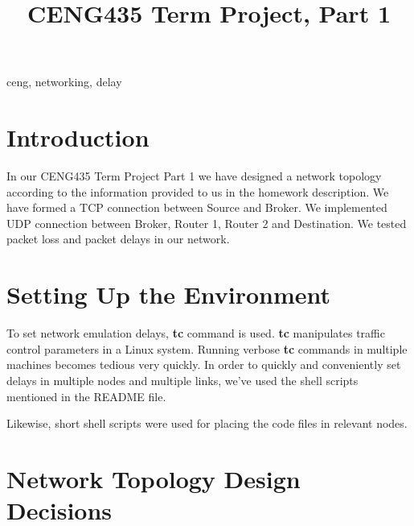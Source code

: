 \documentclass[conference]{IEEEtran}
\begin{document}
\title{CENG435 Term Project, Part 1\\
}

\author{
\IEEEauthorblockA{
}
\and
{}
\IEEEauthorblockA{
}
}

\maketitle

\begin{abstract}
\end{abstract}

\begin{IEEEkeywords}
ceng, networking, delay
\end{IEEEkeywords}

\section{Introduction}

In our CENG435 Term Project Part 1 we have designed a network topology according to the information provided to us in the homework description. We have formed a TCP connection between Source and Broker. We implemented UDP connection between Broker, Router 1, Router 2 and Destination. We tested packet loss and packet delays in our network.

\section{Setting Up the Environment}
To set network emulation delays, \textbf{tc} command is used. \textbf{tc} manipulates
traffic control parameters in a Linux system. Running verbose \textbf{tc} commands
in multiple machines becomes tedious very quickly.
In order to quickly and conveniently set delays in multiple nodes and multiple links,
we've used the shell scripts mentioned in the README file.

Likewise, short shell scripts were used for placing the code files in relevant
nodes.

\section{Network Topology Design Decisions}
\end{document}
